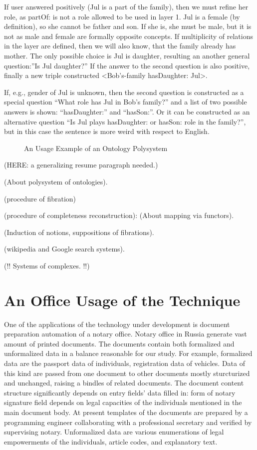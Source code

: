 \documentclass[conference]{IEEEtran}
\begin{document}
{{If user answered positively (Jul is a part of the family), then we must refine her role, as partOf: is not a role allowed to be used in layer 1. Jul is a female (by definition), so she cannot be father and son. If she is, she must be male, but it is not as male and female are formally opposite concepts. If multiplicity of relations in the layer are defined, then we will also know, that the family already has mother. The only possible choice is Jul is daughter, resulting an another general question:''Is Jul daughter?'' If the answer to the second question is also positive, finally a new triple constructed <Bob's-family hasDaughter: Jul>.

If, e.g., gender of Jul is unknown, then the second question is constructed as a special question ``What role has Jul in Bob's family?'' and a list of two possible answers is shown: ``hasDaughter:'' and ``hasSon:''. Or it can be constructed as an alternative question ``Is Jul plays hasDaughter: or hasSon: role in the family?'', but in this case the sentence is more weird with respect to English.

\begin{figure}
\centering\sf
\def\svgwidth{0.9\linewidth}

\caption{An  Usage Example of an Ontology Polysystem}
\label{OPSA}
\end{figure}



(HERE: a generalizing resume paragraph needed.)

(About polysystem of ontologies).

(procedure of fibration)

(procedure of completeness reconstruction): (About mapping via functors).

(Induction of notions, suppositions of fibrations).

(wikipedia and Google search systems).

(!! Systems of complexes. !!)

\section{An Office Usage of the Technique}

One of the applications of the technology under development is document preparation automation of a notary office. Notary office in Russia generate vast amount of printed documents. The documents contain both formalized and unformalized data in a balance reasonable for our study. For example, formalized data are the passport data of individuals, registration data of vehicles. Data of this kind are passed from one document to other documents mostly sturcturized and unchanged, raising a bindles of related documents. The document content structure significantly depends on entry fields’ data filled in: form of notary signature field depends on legal capacities of the individuals mentioned in the main document body. At present templates of the documents are prepared by a programming engineer collaborating with a professional secretary and verified by supervising notary. Unformalized data are various enumerations of legal empowerments of the individuals, article codes, and explanatory text.

}}
\end{document}
